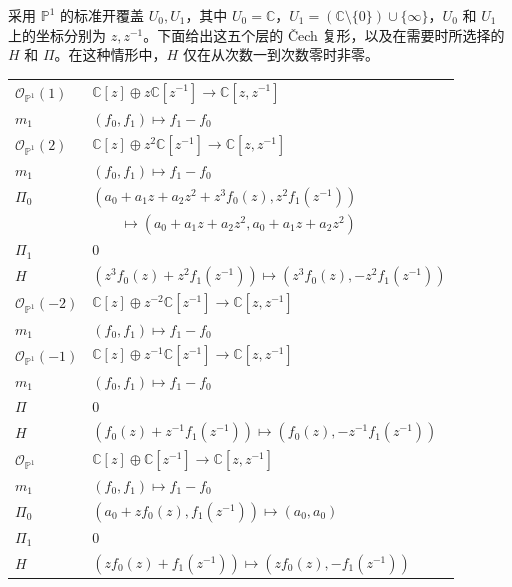 \begin{example}
采用 $\mathbb P^1$ 的标准开覆盖 $U_0,U_1$，其中 $U_0=\mathbb C$，$U_1=(\mathbb C\setminus\{0\})\cup\{\infty\}$，$U_0$ 和 $U_1$ 上的坐标分别为 $z,z^{-1}$。下面给出这五个层的 Čech 复形，以及在需要时所选择的 $H$ 和 $\Pi$。在这种情形中，$H$ 仅在从次数一到次数零时非零。
\begin{table}[H]
\centering
\begingroup\small\setlength{\tabcolsep}{4pt}
\begin{tabular}{ll}
\toprule
$\mathcal O_{\mathbb P^1}(1)$
& $\mathbb C[z]\oplus z\mathbb C[z^{-1}]\longrightarrow\mathbb C[z,z^{-1}]$\\
$m_1$ & $(f_0,f_1)\longmapsto f_1-f_0$\\
\midrule
$\mathcal O_{\mathbb P^1}(2)$
& $\mathbb C[z]\oplus z^2\mathbb C[z^{-1}]\longrightarrow\mathbb C[z,z^{-1}]$\\
$m_1$ & $(f_0,f_1)\longmapsto f_1-f_0$\\
$\Pi_0$ & $(a_0+a_1z+a_2z^2+z^3f_0(z),z^2f_1(z^{-1}))$\\
& $\qquad\longmapsto(a_0+a_1z+a_2z^2,a_0+a_1z+a_2z^2)$\\
$\Pi_1$ & $0$\\
$H$ & $(z^3f_0(z)+z^2f_1(z^{-1}))\longmapsto(z^3f_0(z),-z^2f_1(z^{-1}))$\\
\midrule
$\mathcal O_{\mathbb P^1}(-2)$
& $\mathbb C[z]\oplus z^{-2}\mathbb C[z^{-1}]\longrightarrow\mathbb C[z,z^{-1}]$\\
$m_1$ & $(f_0,f_1)\longmapsto f_1-f_0$\\
\midrule
$\mathcal O_{\mathbb P^1}(-1)$
& $\mathbb C[z]\oplus z^{-1}\mathbb C[z^{-1}]\longrightarrow\mathbb C[z,z^{-1}]$\\
$m_1$ & $(f_0,f_1)\longmapsto f_1-f_0$\\
$\Pi$ & $0$\\
$H$ & $(f_0(z)+z^{-1}f_1(z^{-1}))\longmapsto(f_0(z),-z^{-1}f_1(z^{-1}))$\\
\midrule
$\mathcal O_{\mathbb P^1}$
& $\mathbb C[z]\oplus\mathbb C[z^{-1}]\longrightarrow\mathbb C[z,z^{-1}]$\\
$m_1$ & $(f_0,f_1)\longmapsto f_1-f_0$\\
$\Pi_0$ & $(a_0+zf_0(z),f_1(z^{-1}))\longmapsto(a_0,a_0)$\\
$\Pi_1$ & $0$\\
$H$ & $(zf_0(z)+f_1(z^{-1}))\longmapsto(zf_0(z),-f_1(z^{-1}))$\\
\bottomrule
\end{tabular}
\endgroup
\end{table}


\end{example}
